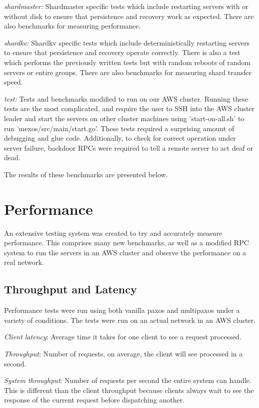 \documentclass[letterpaper,10pt]{article}
\begin{document}
\emph{shardmaster:} Shardmaster specific tests which include restarting servers with or without disk to ensure that persistence and recovery work as expected.  There are also benchmarks for measuring performance.

\emph{shardkv:} Shardkv specific tests which include deterministically restarting servers to ensure that persistence and recovery operate correctly.  There is also a test which performs the previously written tests but with random reboots of random servers or entire groups.  There are also benchmarks for measuring shard transfer speed.

\emph{test:} Tests and benchmarks modified to run on our AWS cluster.  Running these tests are the most complicated, and require the user to SSH into the AWS cluster leader and start the servers on other cluster machines using 'start-on-all.sh' to run 'mexos/src/main/start.go'. These tests required a surprising amount of debugging and glue code.  Additionally, to check for correct operation under server failure, backdoor RPCs were required to tell a remote server to act deaf or dead.

The results of these benchmarks are presented below.

\section{Performance}

An extensive testing system was created to try and accurately measure performance.  This comprises many new benchmarks, as well as a modified RPC system to run the servers in an AWS cluster and observe the performance on a real network.

\subsection{Throughput and Latency}

Performance tests were run using both vanilla paxos and multipaxos under a variety of conditions. The tests were run on an actual network in an AWS cluster. 

\textit{Client latency}: Average time it takes for one client to see a
request processed. 

\textit{Throughput}: Number of requests, on average, the
client will see processed in a second.

\textit{System throughput}: Number of requests per second the entire system can handle. This is different than the client throughput because clients always wait to see the response of the current request before dispatching another.
\end{document}
